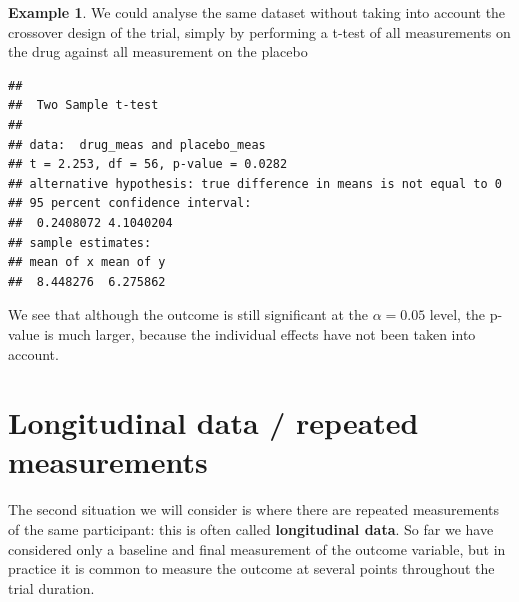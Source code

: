 \documentclass[
  openany]{book}
\newenvironment{Shaded}{\begin{snugshade}}{\end{snugshade}}
\newcommand{\AttributeTok}[1]{\textcolor[rgb]{0.13,0.29,0.53}{#1}}
\newcommand{\CommentTok}[1]{\textcolor[rgb]{0.56,0.35,0.01}{\textit{#1}}}
\newcommand{\FunctionTok}[1]{\textcolor[rgb]{0.13,0.29,0.53}{\textbf{#1}}}
\newcommand{\NormalTok}[1]{#1}
\newcommand{\OtherTok}[1]{\textcolor[rgb]{0.56,0.35,0.01}{#1}}
\newcommand{\SpecialCharTok}[1]{\textcolor[rgb]{0.81,0.36,0.00}{\textbf{#1}}}
\newcommand{\StringTok}[1]{\textcolor[rgb]{0.31,0.60,0.02}{#1}}
\theoremstyle{definition}
\theoremstyle{definition}
\newtheorem{example}{Example}[chapter]
\theoremstyle{definition}
\theoremstyle{definition}
\theoremstyle{remark}
\begin{document}
\begin{example}
We could analyse the same dataset without taking into account the crossover design of the trial, simply by performing a t-test of all measurements on the drug against all measurement on the placebo

\begin{Shaded}
\end{Shaded}

\begin{verbatim}
## 
##  Two Sample t-test
## 
## data:  drug_meas and placebo_meas
## t = 2.253, df = 56, p-value = 0.0282
## alternative hypothesis: true difference in means is not equal to 0
## 95 percent confidence interval:
##  0.2408072 4.1040204
## sample estimates:
## mean of x mean of y 
##  8.448276  6.275862
\end{verbatim}

We see that although the outcome is still significant at the \(\alpha=0.05\) level, the p-value is much larger, because the individual effects have not been taken into account.
\end{example}

\hypertarget{longitudinal-data-repeated-measurements}{%
\section{Longitudinal data / repeated measurements}\label{longitudinal-data-repeated-measurements}}

The second situation we will consider is where there are repeated measurements of the same participant: this is often called \textbf{longitudinal data}. So far we have considered only a baseline and final measurement of the outcome variable, but in practice it is common to measure the outcome at several points throughout the trial duration.
\end{document}
